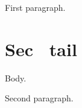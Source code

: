 \documentclass{article}
\begin{document}
First paragraph.

\section{Sec \lxmbf\ tail} Body.

Second paragraph.
\end{document}
